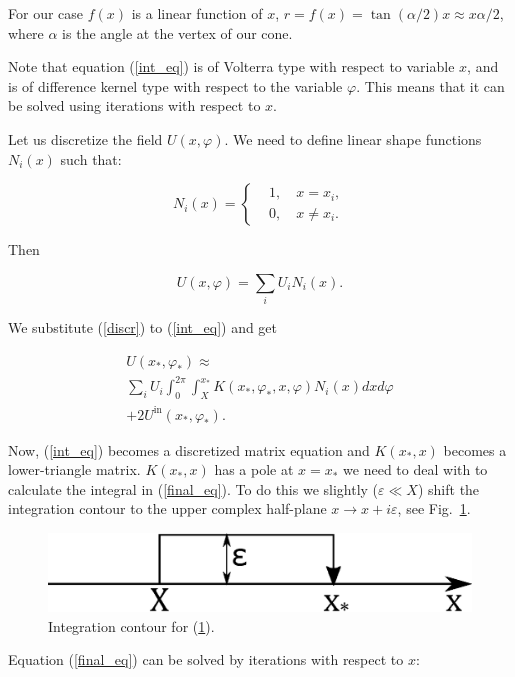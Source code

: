 \documentclass{procDDs}
\begin{document}
For our case $f(x)$ is a linear function of $x$, $r = f(x) = \tan(\alpha/2) x \approx x \alpha/2 $, where $\alpha$ is the angle at the vertex of our cone.

Note that equation (\ref{int_eq}) is of Volterra type with respect to variable $x$, and is of difference kernel type with respect to the variable $\varphi$.
This means that it can be solved using iterations with respect to $x$.

Let us discretize the field $U(x, \varphi)$. We need to define linear shape functions $N_i(x)$ such that:

\begin{equation}
N_i(x) = 
\begin{cases}
&1, \quad x=x_i,\\
&0, \quad x\neq x_i.
\end{cases}
\end{equation}

Then 

\begin{equation} \label{discr}
U(x, \varphi) = \sum_{i} U_i N_i(x).
\end{equation}

We substitute (\ref{discr}) to (\ref{int_eq}) and get

\begin{multline} \label{final_eq}
U(x_*, \varphi_*) \approx \\
\sum_{i} U_i \int_{0}^{2\pi} \int_{X}^{x_*} K(x_*, \varphi_*, x, \varphi) N_i(x) dx d\varphi \\
+ 2U^{\text{in}}(x_*, \varphi_*).
\end{multline}

Now, (\ref{int_eq}) becomes a discretized matrix equation and $K(x_*, x)$ becomes a lower-triangle matrix. $K(x_*, x)$ has a pole at $x = x_*$ we need to deal with to calculate the integral in (\ref{final_eq}). To do this we slightly ($\varepsilon \ll X$) shift the integration contour to the upper complex half-plane $x \rightarrow x + i\varepsilon$, see Fig.~\ref{contour}. 

\begin{figure}[t!]\centering
	\includegraphics[width=.4\textwidth]{contour.eps}
	\caption{Integration contour for (\ref{contour}).}\label{contour}
\end{figure}

Equation (\ref{final_eq}) can be solved by iterations with respect to $x$:
\end{document}
